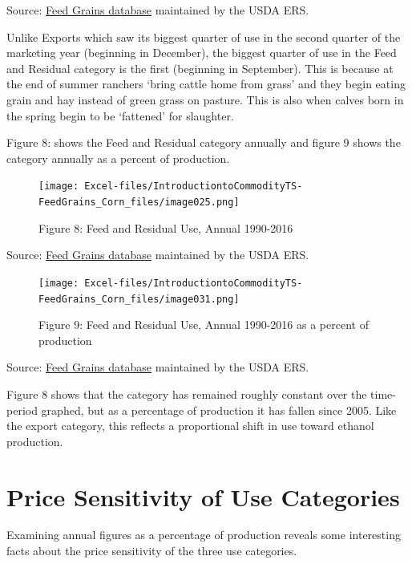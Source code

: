 \documentclass[
]{book}
\begin{document}
Source: \href{http://www.ers.usda.gov/data-products/feed-grains-database/feed-grains-yearbook-tables.aspx\#26780}{Feed Grains database} maintained by the USDA ERS.

Unlike Exports which saw its biggest quarter of use in the second quarter of the marketing year (beginning in December), the biggest quarter of use in the Feed and Residual category is the first (beginning in September). This is because at the end of summer ranchers `bring cattle home from grass' and they begin eating grain and hay instead of green grass on pasture. This is also when calves born in the spring begin to be `fattened' for slaughter.

Figure 8: shows the Feed and Residual category annually and figure 9 shows the category annually as a percent of production.

\begin{figure}
\centering
\texttt{[image: Excel-files/IntroductiontoCommodityTS-FeedGrains\_Corn\_files/image025.png]}
\caption{Figure 8: Feed and Residual Use, Annual 1990-2016}
\end{figure}

Source: \href{http://www.ers.usda.gov/data-products/feed-grains-database/feed-grains-yearbook-tables.aspx\#26780}{Feed Grains database} maintained by the USDA ERS.

\begin{figure}
\centering
\texttt{[image: Excel-files/IntroductiontoCommodityTS-FeedGrains\_Corn\_files/image031.png]}
\caption{Figure 9: Feed and Residual Use, Annual 1990-2016 as a percent of production}
\end{figure}

Source: \href{http://www.ers.usda.gov/data-products/feed-grains-database/feed-grains-yearbook-tables.aspx\#26780}{Feed Grains database} maintained by the USDA ERS.

Figure 8 shows that the category has remained roughly constant over the time-period graphed, but as a percentage of production it has fallen since 2005. Like the export category, this reflects a proportional shift in use toward ethanol production.

\hypertarget{price-sensitivity-of-use-categories}{%
\section{Price Sensitivity of Use Categories}\label{price-sensitivity-of-use-categories}}

Examining annual figures as a percentage of production reveals some interesting facts about the price sensitivity of the three use categories.
\end{document}
